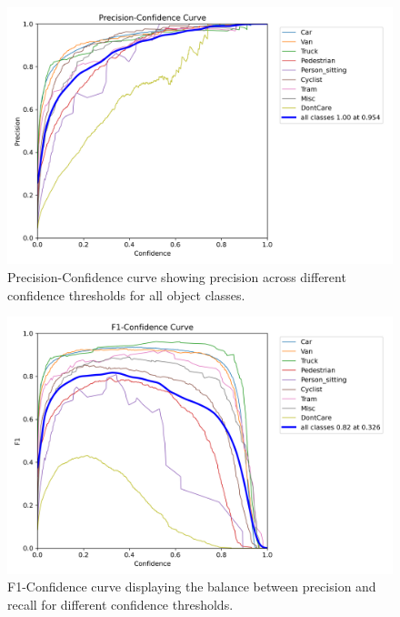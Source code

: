 \documentclass[12pt]{article}
\begin{document}
\begin{figure}[h]
    \centering
    \includegraphics[width=\textwidth]{images/P_curve.png}
    \caption{Precision-Confidence curve showing precision across different confidence thresholds for all object classes.}
    \label{fig:precision_confidence_curve}
\end{figure}

\begin{figure}[h]
    \centering
    \includegraphics[width=\textwidth]{images/F1_curve.png}
    \caption{F1-Confidence curve displaying the balance between precision and recall for different confidence thresholds.}
    \label{fig:f1_confidence_curve}
\end{figure}
\end{document}

